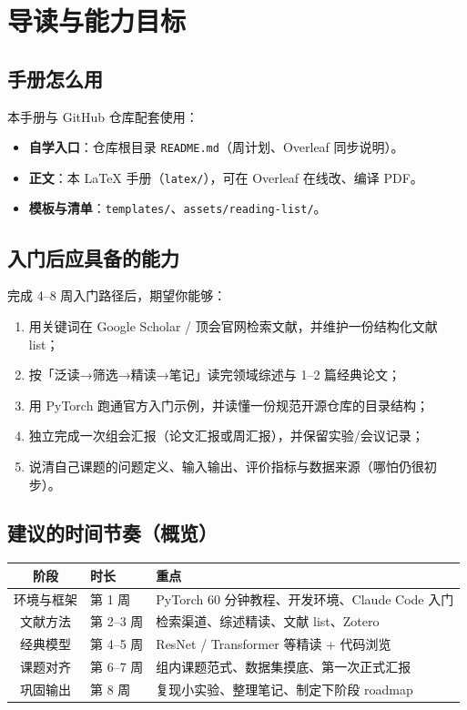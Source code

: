 \section{导读与能力目标}

\subsection{手册怎么用}
本手册与 GitHub 仓库配套使用：
\begin{itemize}
  \item \textbf{自学入口}：仓库根目录 \texttt{README.md}（周计划、Overleaf 同步说明）。
  \item \textbf{正文}：本 LaTeX 手册（\texttt{latex/}），可在 Overleaf 在线改、编译 PDF。
  \item \textbf{模板与清单}：\texttt{templates/}、\texttt{assets/reading-list/}。
\end{itemize}

\subsection{入门后应具备的能力}
完成 4--8 周入门路径后，期望你能够：
\begin{enumerate}
  \item 用关键词在 Google Scholar / 顶会官网检索文献，并维护一份结构化文献 list；
  \item 按「泛读→筛选→精读→笔记」读完领域综述与 1--2 篇经典论文；
  \item 用 PyTorch 跑通官方入门示例，并读懂一份规范开源仓库的目录结构；
  \item 独立完成一次组会汇报（论文汇报或周汇报），并保留实验/会议记录；
  \item 说清自己课题的问题定义、输入输出、评价指标与数据来源（哪怕仍很初步）。
\end{enumerate}

\subsection{建议的时间节奏（概览）}
\begin{center}
\begin{tabular}{clp{8cm}}
\toprule
阶段 & 时长 & 重点 \\
\midrule
环境与框架 & 第 1 周 & PyTorch 60 分钟教程、开发环境、Claude Code 入门 \\
文献方法 & 第 2--3 周 & 检索渠道、综述精读、文献 list、Zotero \\
经典模型 & 第 4--5 周 & ResNet / Transformer 等精读 + 代码浏览 \\
课题对齐 & 第 6--7 周 & 组内课题范式、数据集摸底、第一次正式汇报 \\
巩固输出 & 第 8 周 & 复现小实验、整理笔记、制定下阶段 roadmap \\
\bottomrule
\end{tabular}
\end{center}


